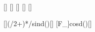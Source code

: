 [\meter]
[\kg]
[\kg]
[\degree]
[\mpss]

[]{(\mAuX/2+\MLX)*\gX/sind(\alX)}[\newton]
[F_\cos\alpha]{\FSX*cosd(\alX)}[\newton]
